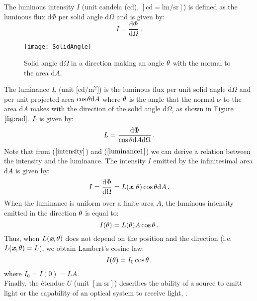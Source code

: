 The luminous intensity $I$ (unit candela (\textrm{cd}), $[\textrm{cd}=\textrm{lm}/\textrm{sr}]$) is defined as the luminous flux $\textrm{d}\Phi$ per solid angle
$\textrm{d}\Omega$ and is given by:
\begin{equation}\label{intensity}
I = \frac{\textrm{d}\Phi}{\textrm{d}\Omega}\;.
\end{equation}
 \begin{figure}[h]
  \begin{center}
  \texttt{[image: SolidAngle]}
  \end{center}
  \caption{Solid angle $\textrm{d}\Omega$ in a direction making an angle $\theta$ with the normal to the area $\textrm{d}A$.}
  \label{fig:rad}
  \end{figure}The luminance $L$ \big(unit $\big[\textrm{cd} / \textrm{m}^2\big]$\big) is the luminous flux per unit solid angle $\textrm{d}\Omega$ and  per unit projected area $\cos\theta \textrm{d}A$ where $\theta$ is the angle that the normal $\boldsymbol{\nu}$ to the area $\textrm{d}A$ makes with the direction of the solid angle $\textrm{d}\Omega$, as shown in Figure $\ref{fig:rad}$.  $L$  is given by:
\begin{equation}\label{luminance1}
  L=\frac{\textrm{d}\Phi}{\cos\theta\textrm{d}A\textrm{d}\Omega}\,.
\end{equation}
\noindent Note that from ($\ref{intensity}$) and ($\ref{luminance1}$) we can derive a relation between the intensity and the luminance. 
The intensity $I$ emitted by the infinitesimal area $\textrm{d}A$ is given by:
\begin{equation}
I = \frac{\textrm{d}\Phi}{\textrm{d}\Omega}= L(\textit{\textbf{x}},\theta)\cos\theta\textrm{d}A \,.
\end{equation}
When the luminance is uniform over a finite area $A$, the luminous intensity emitted in the direction $\theta$ is equal to:
\begin{equation}
I(\theta) = L(\theta) A \cos\theta\,.
\end{equation}
Thus, when $L(\textit{\textbf{x}},\theta)$ does not depend on the position and the direction (i.e. $L(\textit{\textbf{x}},\theta)=L$), we obtain Lambert's cosine law:
\begin{equation}
I(\theta) = I_0\cos\theta\,.
\end{equation}
where $I_0 = I(0) = LA$. \\
\indent Finally, the \'{e}tendue $U$ (unit $[\textrm{m sr}]$) describes the ability of a source to emitt light or the capability of an optical system to receive light, \cite{zhu2011etendue}.
